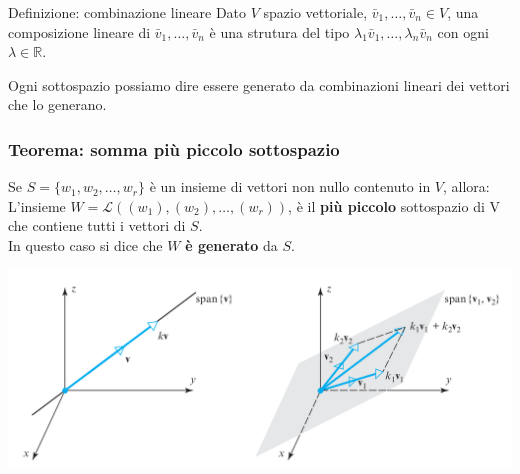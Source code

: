 \documentclass[x11names]{article}
\begin{document}
\begin{center}
\colorbox{myblue}{\begin{minipage}{5.75in}
\begin{blues}{Definizione: combinazione lineare}
Dato $V$ spazio vettoriale, $\bar{v}_{1},\dots,\bar{v}_{n} \in V$, una composizione lineare di $\bar{v}_{1},\dots,\bar{v}_{n}$ è una strutura del tipo $\lambda_{1}\bar{v}_{1},\dots,\lambda_{n}\bar{v}_{n}$ con ogni $\lambda \in \mathbb{R}$.
\end{blues}
\end{minipage}}        
\end{center}
Ogni sottospazio possiamo dire essere generato da combinazioni lineari dei vettori che lo generano. 


\begin{center}
	\colorbox{myred}{\begin{minipage}{5.75in}
			\begin{redes}{}
				\subsubsection{Teorema: somma più piccolo sottospazio}
				Se $S=\{w_1,w_2,\dots,w_{r}\}$ è un insieme di vettori non nullo contenuto in $V$, allora:  \\
				L'insieme  $W = \mathscr{L}\left(\left(w_1\right),\left(w_2\right),\dots,\left(w_{r}\right)\right)$, è il \textbf{più piccolo} sottospazio di V che contiene tutti i vettori di $S$. \\
				In questo caso si dice che  $W$  \textbf{è generato} da $S$.
				
			\end{redes}
	\end{minipage}}        
\end{center}



\begin{center}
\includegraphics[scale=0.3]{figures/span.png}
\end{center}
\end{document}
